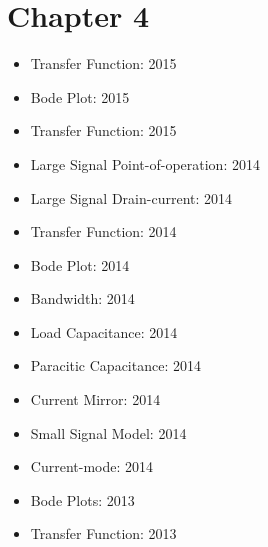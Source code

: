 \documentclass[twocolumn]{article}
\begin{document}
  \section*{Chapter 4}
    \begin{itemize}
      \item Transfer Function: 2015
      \item Bode Plot: 2015
      \item Transfer Function: 2015

      \item Large Signal Point-of-operation: 2014
      \item Large Signal Drain-current: 2014
      \item Transfer Function: 2014
      \item Bode Plot: 2014
      \item Bandwidth: 2014
      \item Load Capacitance: 2014
      \item Paracitic Capacitance: 2014
      \item Current Mirror: 2014
      \item Small Signal Model: 2014
      \item Current-mode: 2014

      \item Bode Plots: 2013
      \item Transfer Function: 2013
    \end{itemize}
\end{document}
